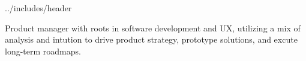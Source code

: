 \documentclass[letterpaper]{article}
\begin{document}
\fontsize{10pt}{13pt}\selectfont

 {../includes/header}

Product manager with roots in software development and UX, utilizing a mix of analysis and intution to drive product strategy, prototype solutions, and excute long-term roadmaps.

\vspace{8pt}\par
{}
\exptrilonQ[1,2,3]
\vspace{2pt}\par
\expinstapageQ[3,4,5,6,7]
\expnerdwalletQ[1,2,4]
\pagebreak
\expstubhubQ[2,3,4]

\vspace{6pt}\par
{}
\vspace{2pt}\par
\propmAiQ*[6,7,8]
\propmPrototypingQ*[5,6,7,8]
\propmAnalyticsQ*[7,8,9,10]
\propmDesignSystemsQ*[1,2]

\vspace{8pt}\par
{}
\education
\end{document}
